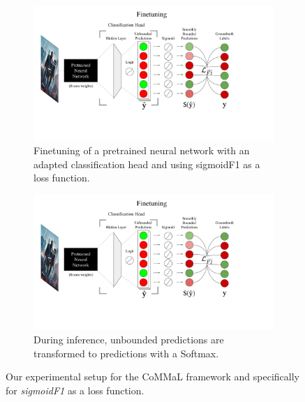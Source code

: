 \begin{figure}[!tp]
\centering
     \begin{subfigure}{0.6\linewidth}
         \centering
         \includegraphics[page=7,width=\linewidth,trim=80 100 110 0,clip]{images/SIGIR2021 Loss Diagram.pdf}
         \caption{Finetuning of a pretrained neural network with an adapted classification head and using sigmoidF1 as a loss function.}
     \end{subfigure}
     \hspace{.02\linewidth}
     \begin{subfigure}{0.36\linewidth}
         \centering
         \includegraphics[page=8,width=\linewidth,trim=190 100 210 0,clip]{images/SIGIR2021 Loss Diagram.pdf}
         \caption{During inference, unbounded predictions are transformed to predictions with a Softmax.}
     \end{subfigure}
     \vspace{.5\baselineskip}
\caption{Our experimental setup for the CoMMaL framework and specifically for \emph{sigmoidF1} as a loss function.}
\label{fig:architecture}
\end{figure}

